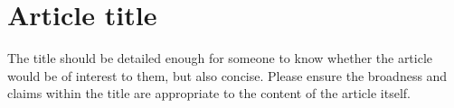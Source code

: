 \section*{Article title}
The title should be detailed enough for someone to know whether the article would be of interest to them, but also concise. Please ensure the broadness and claims within the title are appropriate to the content of the article itself.